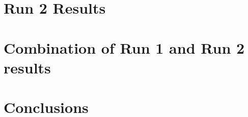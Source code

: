 \documentclass[UKenglish,texlive=2013]{\ATLASLATEXPATH atlasdoc}
\begin{document}
\clearpage
\newpage

\section{Run 2 Results}
\label{sec:result}


\clearpage
\newpage

\section{Combination of Run 1 and Run 2 results}
\label{sec:comb}




\clearpage
\newpage

\section{Conclusions}
\label{sec:conclusion}



%
%
%
\end{document}
